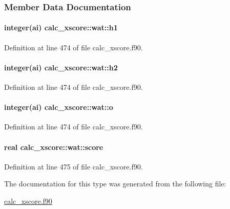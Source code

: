 \subsubsection{Member Data Documentation}
\hypertarget{structcalc__xscore_1_1wat_a2ae1e714b3e29efbfd0270e572cd3f3f}{
\paragraph[{h1}]{\setlength{\rightskip}{0pt plus 5cm}integer(ai) calc\-\_\-xscore\-::wat\-::h1}}\label{structcalc__xscore_1_1wat_a2ae1e714b3e29efbfd0270e572cd3f3f}


Definition at line 474 of file calc\-\_\-xscore.\-f90.

\hypertarget{structcalc__xscore_1_1wat_aa5cacfb0a53be029afd98df80d38ccd7}{
\paragraph[{h2}]{\setlength{\rightskip}{0pt plus 5cm}integer(ai) calc\-\_\-xscore\-::wat\-::h2}}\label{structcalc__xscore_1_1wat_aa5cacfb0a53be029afd98df80d38ccd7}


Definition at line 474 of file calc\-\_\-xscore.\-f90.

\hypertarget{structcalc__xscore_1_1wat_a5f49c0daae037a8ebeb4020f9af1bf9d}{
\paragraph[{o}]{\setlength{\rightskip}{0pt plus 5cm}integer(ai) calc\-\_\-xscore\-::wat\-::o}}\label{structcalc__xscore_1_1wat_a5f49c0daae037a8ebeb4020f9af1bf9d}


Definition at line 474 of file calc\-\_\-xscore.\-f90.

\hypertarget{structcalc__xscore_1_1wat_a0d9bc34d49f28e5c37f9aab0584209fa}{
\paragraph[{score}]{\setlength{\rightskip}{0pt plus 5cm}real calc\-\_\-xscore\-::wat\-::score}}\label{structcalc__xscore_1_1wat_a0d9bc34d49f28e5c37f9aab0584209fa}


Definition at line 475 of file calc\-\_\-xscore.\-f90.



The documentation for this type was generated from the following file\-:\begin{DoxyCompactItemize}
\item 
\hyperlink{calc__xscore_8f90}{calc\-\_\-xscore.\-f90}\end{DoxyCompactItemize}
